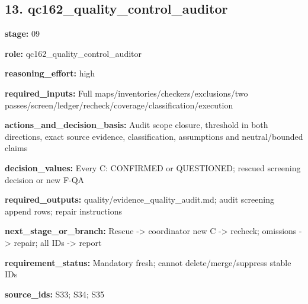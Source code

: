 \documentclass[10pt,a4paper]{article}
\begin{document}
\subsection*{13.\allowbreak{} qc162\_\allowbreak{}quality\_\allowbreak{}control\_\allowbreak{}auditor}
\textbf{stage:} 09\par
\textbf{role:} qc162\_\allowbreak{}quality\_\allowbreak{}control\_\allowbreak{}auditor\par
\textbf{reasoning\_\allowbreak{}effort:} high\par
\textbf{required\_\allowbreak{}inputs:} Full maps/\allowbreak{}inventories/\allowbreak{}checkers/\allowbreak{}exclusions/\allowbreak{}two passes/\allowbreak{}screen/\allowbreak{}ledger/\allowbreak{}recheck/\allowbreak{}coverage/\allowbreak{}classification/\allowbreak{}execution\par
\textbf{actions\_\allowbreak{}and\_\allowbreak{}decision\_\allowbreak{}basis:} Audit scope closure, threshold in both directions, exact source evidence, classification, assumptions and neutral/\allowbreak{}bounded claims\par
\textbf{decision\_\allowbreak{}values:} Every C: CONFIRMED or QUESTIONED; rescued screening decision or new F-\allowbreak{}QA\par
\textbf{required\_\allowbreak{}outputs:} quality/\allowbreak{}evidence\_\allowbreak{}quality\_\allowbreak{}audit.\allowbreak{}md; audit screening append rows; repair instructions\par
\textbf{next\_\allowbreak{}stage\_\allowbreak{}or\_\allowbreak{}branch:} Rescue -\allowbreak{}> coordinator new C -\allowbreak{}> recheck; omissions -\allowbreak{}> repair; all IDs -\allowbreak{}> report\par
\textbf{requirement\_\allowbreak{}status:} Mandatory fresh; cannot delete/\allowbreak{}merge/\allowbreak{}suppress stable IDs\par
\textbf{source\_\allowbreak{}ids:} S33; S34; S35\par
\end{document}
